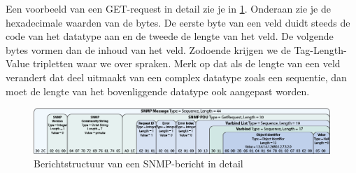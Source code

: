 Een voorbeeld van een GET-request in detail zie je in \cref{fig-berichtstructuur-3}.
Onderaan zie je de hexadecimale waarden van de bytes.
De eerste byte van een veld duidt steeds de code van het datatype aan en de tweede de lengte van het veld.
De volgende bytes vormen dan de inhoud van het veld.
Zodoende krijgen we de Tag-Length-Value tripletten waar we over spraken.
Merk op dat als de lengte van een veld verandert dat deel uitmaakt van een complex datatype zoals een sequentie,
dan moet de lengte van het bovenliggende datatype ook aangepast worden.

\begin{figure}[h]
	\centering
	\includegraphics[scale=0.40]{figures/snmp/berichtstructuur-3}
	\caption{Berichtstructuur van een SNMP-bericht in detail}
	\label{fig-berichtstructuur-3}
\end{figure}

